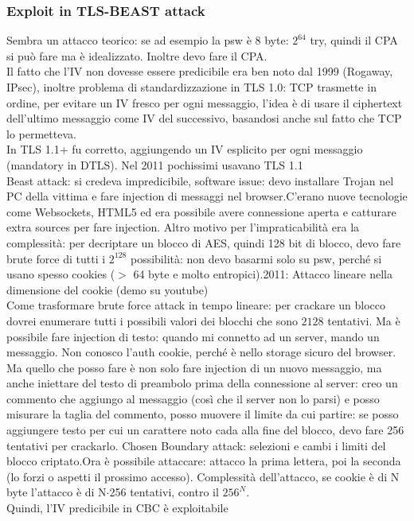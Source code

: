 \documentclass[16px]{article}
\begin{document}
\subsubsection{Exploit in TLS-BEAST attack}
Sembra un attacco teorico: se ad esempio la psw è 8 byte: $2^{64}$ try, quindi il CPA si può fare ma è idealizzato. Inoltre devo fare il CPA.\\ Il fatto che l'IV non dovesse essere predicibile era ben noto dal 1999 (Rogaway, IPsec), inoltre problema di standardizzazione in TLS 1.0: TCP trasmette in ordine, per evitare un IV fresco per ogni messaggio, l'idea è di usare il ciphertext dell'ultimo messaggio come IV del successivo, basandosi anche sul fatto che TCP lo permetteva.\\ In TLS 1.1+ fu corretto, aggiungendo un IV esplicito per ogni messaggio (mandatory in DTLS). Nel 2011 pochissimi usavano TLS 1.1\\
Beast attack: si credeva impredicibile, software issue: devo installare Trojan nel PC della vittima e fare injection di messaggi nel browser.C'erano nuove tecnologie come Websockets, HTML5 ed era possibile avere connessione aperta e catturare extra sources per fare injection. Altro motivo per l'impraticabilità era la complessità: per decriptare un blocco di AES, quindi 128 bit di blocco, devo fare brute force di tutti i $2^{128}$ possibilità: non devo basarmi solo su psw, perché si usano spesso cookies ($>$ 64 byte e molto entropici).2011: Attacco lineare nella dimensione del cookie (demo su youtube)\\ Come trasformare brute force attack in tempo lineare: per crackare un blocco dovrei enumerare tutti i possibili valori dei blocchi che sono $2{128}$ tentativi. Ma è possibile fare injection di testo: quando mi connetto ad un server, mando un messaggio. Non conosco l'auth cookie, perché è nello storage sicuro del browser. Ma quello che posso fare è non solo fare injection di un nuovo messaggio, ma anche iniettare del testo di preambolo prima della connessione al server: creo un commento che aggiungo al messaggio (così che il server non lo parsi) e posso misurare la taglia del commento, posso muovere il limite da cui partire: se posso aggiungere testo per cui un carattere noto cada alla fine del blocco, devo fare 256 tentativi per crackarlo. Chosen Boundary attack: selezioni e cambi i limiti del blocco criptato.Ora è possibile attaccare: attacco la prima lettera, poi la seconda (lo forzi o aspetti il prossimo accesso). Complessità dell'attacco, se cookie è di N byte l'attacco è di N$\cdot$256 tentativi, contro il $256^N$.
\\ Quindi, l'IV predicibile in CBC è exploitabile
\end{document}
